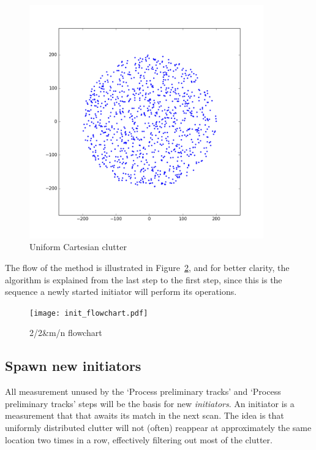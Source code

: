 \begin{figure}
\begin{minipage}{0.45\textwidth}
\includegraphics[width=0.9\textwidth]{Figures/clutterCartesian.png}
\caption{Uniform Cartesian clutter}\label{fig:clutter_cartesian}
\end{minipage}
\end{figure}
The flow of the method is illustrated in Figure~\ref{fig:init_flowchart}, and for better clarity, the algorithm is explained from the last step to the first step, since this is the sequence a newly started initiator will perform its operations.
\begin{figure}[H]
\centering
\texttt{[image: init\_flowchart.pdf]}
\caption{2/2\&m/n flowchart}\label{fig:init_flowchart}
\end{figure}


\subsection{Spawn new initiators}
All measurement unused by the `Process preliminary tracks' and `Process preliminary tracks' steps will be the basis for new \emph{initiators}. An initiator is a measurement that that awaits its match in the next scan. The idea is that uniformly distributed clutter will not (often) reappear at approximately the same location two times in a row, effectively filtering out most of the clutter.

